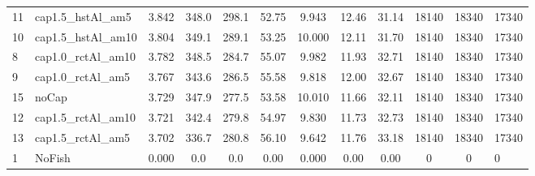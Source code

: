 \documentclass[11pt]{book}
\begin{document}
\begin{landscape}
\begin{longtable}[t]{llcccccccccl}
11 & cap1.5\_hstAl\_am5 & 3.842 & 348.0 & 298.1 & 52.75 & 9.943 & 12.46 & 31.14 & 18140 & 18340 & 17340\\
10 & cap1.5\_hstAl\_am10 & 3.804 & 349.1 & 289.1 & 53.25 & 10.000 & 12.11 & 31.70 & 18140 & 18340 & 17340\\
8 & cap1.0\_rctAl\_am10 & 3.782 & 348.5 & 284.7 & 55.07 & 9.982 & 11.93 & 32.71 & 18140 & 18340 & 17340\\
9 & cap1.0\_rctAl\_am5 & 3.767 & 343.6 & 286.5 & 55.58 & 9.818 & 12.00 & 32.67 & 18140 & 18340 & 17340\\
15 & noCap & 3.729 & 347.9 & 277.5 & 53.58 & 10.010 & 11.66 & 32.11 & 18140 & 18340 & 17340\\
12 & cap1.5\_rctAl\_am10 & 3.721 & 342.4 & 279.8 & 54.97 & 9.830 & 11.73 & 32.73 & 18140 & 18340 & 17340\\
13 & cap1.5\_rctAl\_am5 & 3.702 & 336.7 & 280.8 & 56.10 & 9.642 & 11.76 & 33.18 & 18140 & 18340 & 17340\\
1 & NoFish & 0.000 & 0.0 & 0.0 & 0.00 & 0.000 & 0.00 & 0.00 & 0 & 0 & 0\\*
\end{longtable}
\end{landscape}
\endgroup{}

\newpage
\end{document}
